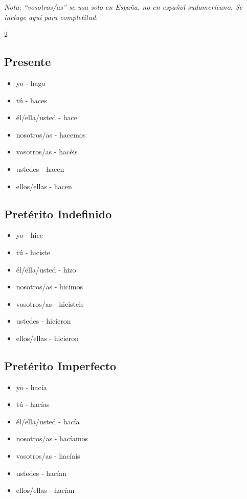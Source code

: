 \documentclass[12pt,a4paper]{article}
\begin{document}
\textit{Nota: \enquote{vosotros/as} se usa solo en España, no en español sudamericano. Se incluye aquí para completitud.}

\begin{multicols}{2}

\subsection*{Presente}
\begin{itemize}[leftmargin=*]
    \item yo - hago
    \item tú - haces
    \item él/ella/usted - hace
    \item nosotros/as - hacemos
    \item vosotros/as - hacéis
    \item ustedes - hacen
    \item ellos/ellas - hacen
\end{itemize}

\subsection*{Pretérito Indefinido}
\begin{itemize}[leftmargin=*]
    \item yo - hice
    \item tú - hiciste
    \item él/ella/usted - hizo
    \item nosotros/as - hicimos
    \item vosotros/as - hicisteis
    \item ustedes - hicieron
    \item ellos/ellas - hicieron
\end{itemize}

\subsection*{Pretérito Imperfecto}
\begin{itemize}[leftmargin=*]
    \item yo - hacía
    \item tú - hacías
    \item él/ella/usted - hacía
    \item nosotros/as - hacíamos
    \item vosotros/as - hacíais
    \item ustedes - hacían
    \item ellos/ellas - hacían
\end{itemize}


\end{multicols}
\end{document}

